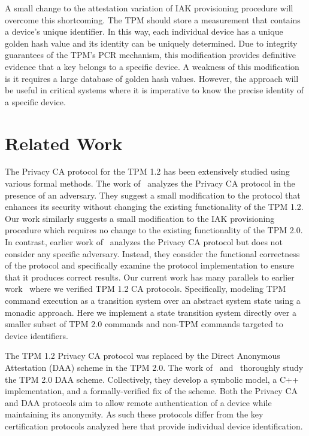\documentclass[runningheads]{llncs}
\begin{document}
A small change to the attestation variation of IAK provisioning
procedure will overcome this shortcoming. The TPM should store a
measurement that contains a device's unique identifier. In this way,
each individual device has a unique golden hash value and its identity
can be uniquely determined.  Due to integrity guarantees of the TPM's
PCR mechanism, this modification provides definitive evidence that a
key belongs to a specific device. A weakness of this modification is
it requires a large database of golden hash values.  However, the
approach will be useful in critical systems where it is imperative to
know the precise identity of a specific device.
%
%
%
\section{Related Work}
The Privacy CA protocol for the TPM 1.2 has been extensively studied
using various formal methods.  The work
of~\citet{PrivacyCAAnalysis-Chen} analyzes the Privacy CA protocol in
the presence of an adversary. They suggest a small modification to the
protocol that enhances its security without changing the existing
functionality of the TPM 1.2. Our work similarly suggests a small
modification to the IAK provisioning procedure which requires no
change to the existing functionality of the TPM 2.0.  In contrast,
earlier work of~\citet{PrivacyCAAnalysis-Hall} analyzes the Privacy CA
protocol but does not consider any specific adversary. Instead, they
consider the functional correctness of the protocol and specifically
examine the protocol implementation to ensure that it produces correct
results.  Our current work has many parallels to earlier
work~\citep{PrivacyCAAnalysis-Hall} where we verified TPM 1.2 CA
protocols.  Specifically, modeling TPM command execution as a
transition system over an abstract system state using a monadic
approach. Here we implement a state transition system directly over a
smaller subset of TPM 2.0 commands and non-TPM commands targeted to
device identifiers.

The TPM 1.2 Privacy CA protocol was replaced by the Direct Anonymous
Attestation (DAA) scheme in the TPM 2.0.  The work
of~\citet{DAAAnalysis-Whit} and~\citet{DAAAnalysis-Wes} thoroughly
study the TPM 2.0 DAA scheme.  Collectively, they develop a symbolic
model, a C++ implementation, and a formally-verified fix of the
scheme. Both the Privacy CA and DAA protocols aim to allow remote
authentication of a device while maintaining its anonymity. As such
these protocols differ from the key certification protocols analyzed
here that provide individual device identification.
\end{document}
